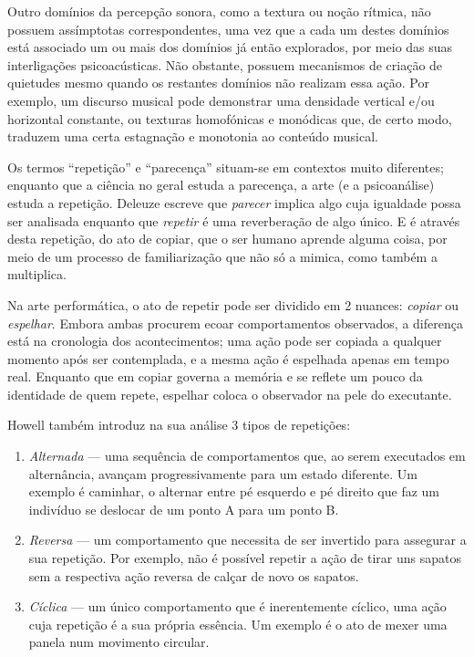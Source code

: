 \documentclass[../main.tex]{subfiles}
\begin{document}

Outro domínios da percepção sonora, como a textura ou noção rítmica, não possuem assímptotas correspondentes, uma vez que a cada um destes domínios está associado um ou mais dos domínios já então explorados, por meio das suas interligações psicoacústicas. Não obstante, possuem mecanismos de criação de quietudes mesmo quando os restantes domínios não realizam essa ação. Por exemplo, um discurso musical pode demonstrar uma densidade vertical e/ou horizontal constante, ou texturas homofónicas e monódicas que, de certo modo, traduzem uma certa estagnação e monotonia ao conteúdo musical.


Os termos \enquote{repetição} e \enquote{parecença} situam-se em contextos muito diferentes; enquanto que a ciência no geral estuda a parecença, a arte (e a psicoanálise) estuda a repetição. Deleuze escreve que \textsl{parecer} implica algo cuja igualdade possa ser analisada enquanto que \textsl{repetir} é uma reverberação de algo único\cite{deleuze}. E é através desta repetição, do ato de copiar, que o ser humano aprende alguma coisa, por meio de um processo de familiarização que não só a mimica, como também a multiplica\cite{howell1999}.

Na arte performática, o ato de repetir pode ser dividido em 2 nuances: \textsl{copiar} ou \textsl{espelhar}. Embora ambas procurem ecoar comportamentos observados, a diferença está na cronologia dos acontecimentos; uma ação pode ser copiada a qualquer momento após ser contemplada, e a mesma ação é espelhada apenas em tempo real. Enquanto que em copiar governa a memória e se reflete um pouco da identidade de quem repete, espelhar coloca o observador na pele do executante.

Howell também introduz na sua análise 3 tipos de repetições:
\begin{enumerate}
    \item \textsl{Alternada} — uma sequência de comportamentos que, ao serem executados em alternância, avançam progressivamente para um estado diferente. Um exemplo é caminhar, o alternar entre pé esquerdo e pé direito que faz um indivíduo se deslocar de um ponto A para um ponto B.
    \item \textsl{Reversa} — um comportamento que necessita de ser invertido para assegurar a sua repetição. Por exemplo, não é possível repetir a ação de tirar uns sapatos sem a respectiva ação reversa de calçar de novo os sapatos.
    \item \textsl{Cíclica} — um único comportamento que é inerentemente cíclico, uma ação cuja repetição é a sua própria essência. Um exemplo é o ato de mexer uma panela num movimento circular.
\end{enumerate}
\end{document}
